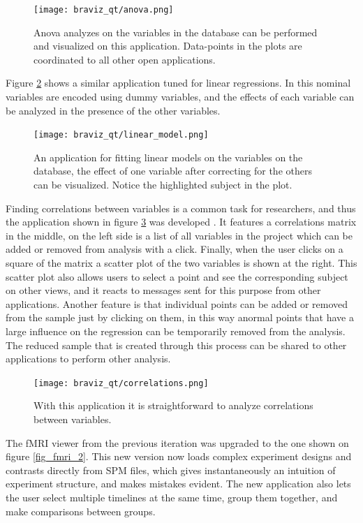 \begin{figure}
\centering
\texttt{[image: braviz\_qt/anova.png]}
\caption{\label{fig_anova_2}Anova analyzes on the variables in the database can be performed and visualized on this application. Data-points in the plots are coordinated to all other open applications.}
\end{figure}

Figure \ref{fig_lm_2} shows a similar application tuned for linear regressions. In this nominal variables are encoded using dummy variables, and the effects of each variable can be analyzed in the presence of the other variables.

\begin{figure}
\centering
\texttt{[image: braviz\_qt/linear\_model.png]}
\caption{\label{fig_lm_2}An application for fitting linear models on the variables on the database, the effect of one variable after correcting for the others can be visualized. Notice the highlighted subject in the plot.}
\end{figure}

Finding correlations between variables is a common task for researchers, and thus the application shown in figure \ref{fig_correlations} was developed . It features a correlations matrix in the middle, on the left side is a list of all variables in the project which can be added or removed from analysis with a click. Finally, when the user clicks on a square of the matrix a scatter plot of the two variables is shown at the right. This scatter plot also allows users to select a point and see the corresponding subject on other views, and it reacts to messages sent for this purpose from other applications. Another feature is that individual points can be added or removed from the sample just by clicking on them, in this way anormal points that have a large influence on the regression can be temporarily removed from the analysis. The reduced sample that is created through this process can be shared to other applications to perform other analysis.

\begin{figure}
\centering
\texttt{[image: braviz\_qt/correlations.png]}
\caption{\label{fig_correlations}With this application it is straightforward to analyze correlations between variables.}
\end{figure}

The fMRI viewer from the previous iteration was upgraded to the one shown on figure \ref{fig_fmri_2}. This new version now loads complex experiment designs and contrasts directly from SPM files, which gives instantaneously an intuition of experiment structure, and makes mistakes evident. The new application also lets the user select multiple timelines at the same time, group them together, and make comparisons between groups.

